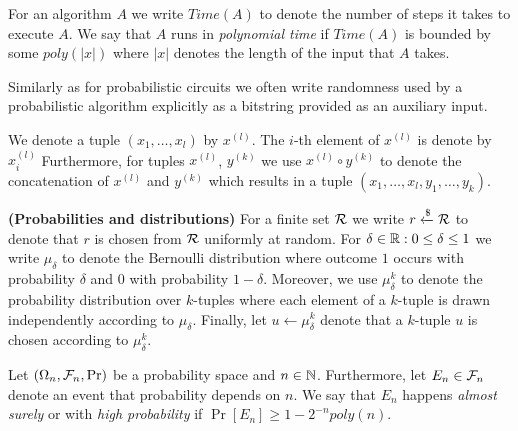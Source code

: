 
For an algorithm $A$ we write $\mathit{Time}(A)$ to denote the number of steps it takes to execute $A$.
We say that $A$ runs in \textit{polynomial time} if $\mathit{Time}(A)$ is bounded by some $poly(|x|)$ where $|x|$ denotes the length of the input that $A$ takes.

Similarly as for probabilistic circuits we often write randomness used by a probabilistic algorithm explicitly
as a bitstring provided as an auxiliary input.

We denote a tuple $(x_1, \dotsc, x_l)$ by $x^{(l)}$.
The $i$-th element of $x^{(l)}$ is denote by $x^{(l)}_i$
Furthermore, for tuples $x^{(l)}$, $y^{(k)}$ we use $x^{(l)} \circ y^{(k)}$ to denote the concatenation of $x^{(l)}$ and $y^{(k)}$ which results in
a tuple $(x_1, \dotsc, x_l, y_1, \dotsc, y_k)$.

\textbf{(Probabilities and distributions)}
For a finite set $\mathcal{R}$ we write $r \xleftarrow{\$} \mathcal{R}$ to denote that $r$ is chosen from $\mathcal{R}$ uniformly at random.
For $\delta \in \mathbb{R} : 0 \leq \delta \leq 1$ we write $\mu_{\delta}$ to denote the Bernoulli distribution where outcome $1$ occurs with
probability $\delta$ and $0$ with probability $1-\delta$.
Moreover, we use $\mu_{\delta}^k$ to denote the probability distribution over $k$-tuples
where each element of a $k$-tuple is drawn independently according to $\mu_{\delta}$.
Finally, let $u \leftarrow \mu_{\delta}^k$ denote that a $k$-tuple $u$ is chosen according to $\mu_{\delta}^k$.

Let $(\Omega_n, \mathcal{F}_n, \Pr)$ be a probability space and $n \in \mathbb{N}$.
Furthermore, let $E_n \in \mathcal{F}_n$ denote an event that probability depends on $n$.
We say that $E_n$ happens \textit{almost surely} or with \textit{high probability} if $\Pr[E_n] \geq 1 - 2^{-n} \mathit{poly}(n)$.

